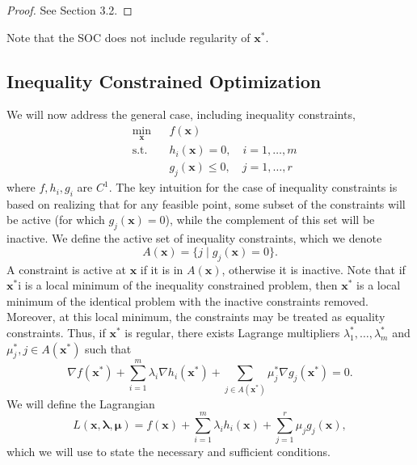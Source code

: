 \begin{proof}
See \cite{bertsekas2016nonlinear} Section 3.2.
\end{proof}
Note that the SOC does not include regularity of $\bm{x}^*$. 

\subsection{Inequality Constrained Optimization}

We will now address the general case, including inequality constraints,
\begin{equation*}
\begin{aligned}
& \underset{\bm{x}}{\min}
& & f(\bm{x})\\
& \textrm{s.t.} & & h_i(\bm{x}) = 0, \quad i = 1, \ldots, m\\
& & & g_j(\bm{x}) \leq 0, \quad j = 1, \ldots, r
\end{aligned}
\end{equation*}
where $f,h_i,g_i$ are $C^1$. The key intuition for the case of  inequality constraints is based on realizing that for any feasible point, some subset of the constraints will be active (for which $g_j(\bm{x}) = 0$), while the complement of this set will be inactive. We define the active set of inequality constraints, which we denote 
\begin{equation}
    A(\bm{x}) = \{j \mid g_j(\bm{x}) = 0\}.
\end{equation}
A constraint is active at $\bm{x}$ if it is in $A(\bm{x})$, otherwise it is inactive. Note that if $\bm{x}^*$i is a local minimum of the inequality constrained problem, then $\bm{x}^*$ is a local minimum of the identical problem with the inactive constraints removed. Moreover, at this local minimum, the constraints may be treated as equality constraints. Thus, if $\bm{x}^*$ is regular, there exists Lagrange multipliers $\lambda_1^*, \ldots, \lambda_m^*$ and $\mu_j^*, j \in A(\bm{x}^*)$ such that 
\begin{equation}
\nabla f(\bm{x}^*) + \sum^m_{i=1} \lambda_i \nabla h_i(\bm{x}^*) + \sum_{j \in A(\bm{x}^*)} \mu_j^* \nabla g_j(\bm{x}^*)= 0.    
\end{equation}
We will define the Lagrangian
\begin{equation}
    L(\bm{x},\bm{\lambda}, \bm{\mu}) = f(\bm{x}) + \sum^m_{i=1} \lambda_i h_i(\bm{x}) + \sum_{j =1}^r \mu_j  g_j(\bm{x}),
\end{equation}
which we will use to state the necessary and sufficient conditions. 

